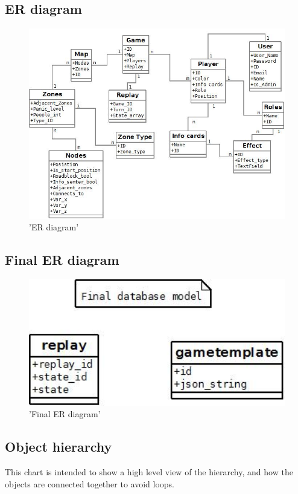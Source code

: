 \subsection{ER diagram}
\begin{figure}[H]
  \centering
    \includegraphics[width=1.0\textwidth]{img/erdiagram.jpeg}
  \caption{'ER diagram'} 
  \label{fig:erdiagram}
\end{figure}

\subsection{Final ER diagram}
\begin{figure}[H]
  \centering
    \includegraphics[width=1.0\textwidth]{img/finaldatabase.jpeg}
  \caption{'Final ER diagram'} 
  \label{fig:final_erdiagram}
\end{figure}

\subsection{Object hierarchy}
This chart is intended to show a high level view of the hierarchy, and how the objects are connected together to avoid loops. 

